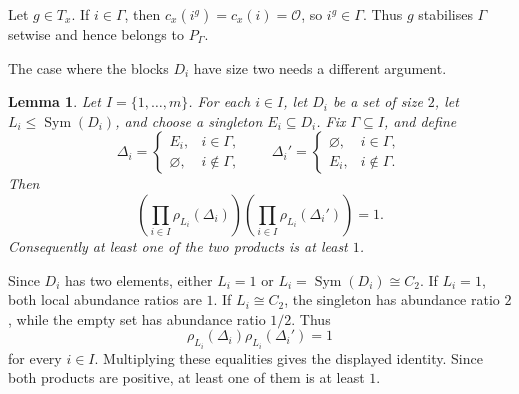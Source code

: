 \documentclass[10pt]{amsart}
\newtheorem{lemma}[theorem]{Lemma}
\theoremstyle{definition}
\renewcommand{\leq}{\leqslant}
\let\oldendproof\endproof
\renewenvironment{proof}[1][\proofname]{%
  \oldproof[\bfseries #1]%
}{\oldendproof}
\DeclareMathOperator{\Sym}{Sym}
\numberwithin{equation}{section}
\numberwithin{table}{section}
\begin{document}
\begin{proof}
Let $g\in T_x$. If $i\in\Gamma$, then
$c_x(i^g)=c_x(i)=\mathcal O$, so $i^g\in\Gamma$. Thus $g$ stabilises
$\Gamma$ setwise and hence belongs to $P_\Gamma$.
\end{proof}


The case where the blocks $D_i$ have size two needs a different argument.

\begin{lemma}\label{lem:c2-balance}
Let $I=\{1,\ldots,m\}$. For each $i\in I$, let $D_i$ be a set of size $2$,
let $L_i\leq\Sym(D_i)$, and choose a singleton $E_i\subseteq D_i$. Fix
$\Gamma\subseteq I$, and define
$$
 \Delta_i=
 \begin{cases}
  E_i,&i\in\Gamma,\\
  \varnothing,&i\notin\Gamma,
 \end{cases}
 \qquad
 \Delta_i'=
 \begin{cases}
  \varnothing,&i\in\Gamma,\\
  E_i,&i\notin\Gamma.
 \end{cases}
$$
Then
$$
 \left(\prod_{i\in I}\rho_{L_i}(\Delta_i)\right)
 \left(\prod_{i\in I}\rho_{L_i}(\Delta_i')\right)=1.
$$
Consequently at least one of the two products is at least $1$.
\end{lemma}

\begin{proof}
Since $D_i$ has two elements, either $L_i=1$ or
$L_i=\Sym(D_i)\cong C_2$. If $L_i=1$, both local abundance ratios are $1$.
If $L_i\cong C_2$, the singleton has abundance ratio $2$, while the empty
set has abundance ratio $1/2$. Thus
$$
 \rho_{L_i}(\Delta_i)\rho_{L_i}(\Delta_i')=1
$$
for every $i\in I$. Multiplying these equalities gives the displayed
identity. Since both products are positive, at least one of them is at
least $1$.
\end{proof}
\end{document}
